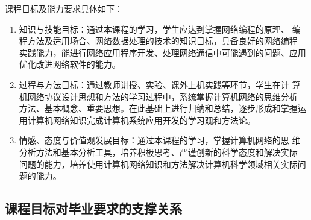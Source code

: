 \documentclass{swfusyllabus}
\begin{document}
课程目标及能力要求具体如下：
\begin{enumerate}
\item 知识与技能目标：通过本课程的学习，学生应达到掌握网络编程的原理、
  编程方法及适用场合、网络数据处理的技术的知识目标，具备良好的网络编程
  实践能力，能进行网络应用程序开发、处理网络通信中可能遇到的问题、应用
  优化改进网络软件的能力。
\item 过程与方法目标：通过教师讲授、实验、课外上机实践等环节，学生在计
  算机网络协议设计思想和方法的学习过程中，系统掌握计算机网络的思维分析
  方法、基本概念、重要思想。在此基础上进行归纳和总结，逐步形成和掌握运
  用计算机网络知识完成计算机系统应用开发的学习观和方法论。
\item 情感、态度与价值观发展目标：通过本课程的学习，掌握计算机网络的思
  维分析方法和基本分析工具，培养积极思考、严谨创新的科学态度和解决实际
  问题的能力，培养使用计算机网络知识和方法解决计算机科学领域相关实际问
  题的能力。
\end{enumerate}

\subsection{课程目标对毕业要求的支撑关系}
\end{document}
